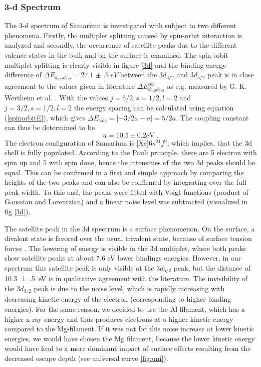 \documentclass[a4paper]{scrartcl}
\numberwithin{equation}{section}
\numberwithin{figure}{section}
\numberwithin{table}{section}
\newcommand{\eq}[2]{\begin{equation}#1\label{#2}\end{equation}}
\newcommand{\Formel}[1]{(\ref{#1})}
\begin{document}
\FloatBarrier
\subsubsection{3-d Spectrum}
The 3-d spectrum of Samarium is investigated with subject to two different phenomena. Firstly, the multiplet splitting caused by spin-orbit interaction is analyzed and secondly, the occurrence of satellite peaks due to the different valence-states in the bulk and on the surface is examined. The spin-orbit multiplet splitting is clearly visible in figure \ref{3d} and the binding energy difference of $\Delta E_{d_{3/2}d_{5/2}} = \SI{27.1(5)}{eV}$ between the $3d_{3/2}$ and $3d_{5/2}$ peak is in close agreement to the values given in literature $\Delta E_{d_{3/2}d_{5/2}}^{\text{ref}}$ as e.g. measured by  G. K. Wertheim et al. \cite{wertheim}. With the values ${j=5/2, s=1/2, l=2}$ and ${j=3/2, s=1/2, l=2}$ the energy spacing can be calculated using equation \Formel{spinorbitE}, which gives $\Delta E_\text{calc}=\lvert-3/2 a - a \rvert=5/2 a$. The coupling constant can thus be determined to be 
\eq{a=10.5\pm 0.2\text{eV} \; .}{a}
The electron configuration of Samarium is [Xe]$6s^24f^6$, which implies, that the 3d shell is fully populated. According to the Pauli principle, there are 5 electron with spin up and 5 with spin done, hence the intensities of the two 3d peaks should be equal. This can be confirmed in a first and simple approach by comparing the heights of the two peaks and can also be confirmed by integrating over the full peak width. To this end, the peaks were fitted with Voigt functions (product of Gaussian and Lorentzian) and a linear noise level was subtracted (visualized in fig \ref{3d}).

The satellite peak in the 3d spectrum is a surface phenomenon. On the surface, a divalent state is favored over the usual trivalent state, because of surface tension forces  \cite{johansson}. The lowering of energy is visible in the 3d multiplet, where both peaks show satellite peaks at about 7.6 eV \cite{wertheim} lower bindings energies. However, in our spectrum this satellite peak is only visible at the $3d_{5/2}$ peak, but the distance of \SI{10.3(5)}{eV} is in qualitative agreement with the literature. The invisibility of the $3d_{3/2}$ peak is due to the noise level, which is rapidly increasing with decreasing kinetic energy of the electron (corresponding to higher binding energies). For the same reason, we decided to use the Al-filament, which has a higher x-ray energy and thus produces electrons at a higher kinetic energy compared to the Mg-filament. If it was not for this noise increase at lower kinetic energies, we would have chosen the Mg filament, because the lower kinetic energy would have lead to a more dominant impact of surface effects resulting from the decreased escape depth (see universal curve \ref{fig:uni}).
\end{document}
